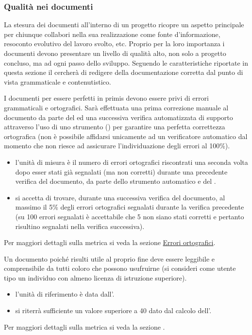 \documentclass[a4paper, titlepage]{article}
\begin{document}
\subsubsection{Qualità nei documenti}
La stesura dei documenti all'interno di un progetto ricopre un aspetto principale per chiunque collabori nella sua realizzazione come fonte d'informazione, resoconto evolutivo del lavoro svolto, etc. Proprio per la loro importanza i documenti devono presentare un livello di qualità alto, non solo a progetto concluso, ma ad ogni passo dello sviluppo.
\newline Seguendo le caratteristiche riportate in questa sezione il  cercherà di redigere della documentazione corretta dal punto di vista grammaticale e contenutistico.

I documenti per essere perfetti in primis devono essere privi di errori grammaticali e ortografici. Sarà effettuata una prima correzione manuale al documento da parte del  ed una successiva verifica automatizzata di supporto attraverso l'uso di uno strumento () per garantire una perfetta correttezza ortografica (non è possibile affidarsi unicamente ad un verificatore automatico dal momento che non riesce ad assicurare l'individuazione degli errori al 100\%).  
\begin{itemize}
\item {} l'unità di misura è il numero di errori ortografici riscontrati una seconda volta dopo esser stati già segnalati (ma non corretti) durante una precedente verifica del documento, da parte dello strumento automatico e del .
\item {} si accetta di trovare, durante una successiva verifica del documento, al massimo il 5\% degli errori ortografici segnalati durante la verifica precedente (su 100 errori segnalati è accettabile che 5 non siano stati corretti e pertanto risultino segnalati nella verifica successiva).
\end{itemize}
Per maggiori dettagli sulla metrica si veda la sezione \hyperref[par:errort]{Errori ortografici}.

Un documento poiché risulti utile al proprio fine deve essere leggibile e comprensibile da tutti coloro che possono usufruirne (si consideri come utente tipo un individuo con almeno licenza di istruzione superiore).
\begin{itemize}
\item {} l'unità di riferimento è data dall'.
\item {} si riterrà sufficiente un valore superiore a 40 dato dal calcolo dell'.
\end{itemize}
Per maggiori dettagli sulla metrica si veda la sezione \hyperref[par:IG]{}.
\end{document}
